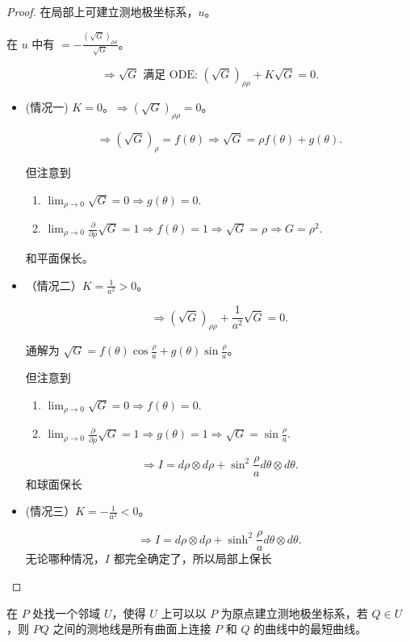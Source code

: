 \documentclass[lang=cn,10pt,thmcnt=section]{elegantbook}
\begin{document}
\begin{proof}
    在局部上可建立测地极坐标系，\( u \)。

在 \( u \) 中有 \(  = -\frac{(\sqrt{G})_{\rho\rho}}{\sqrt{G}} \)。

\[
\Rightarrow \sqrt{G} \text{ 满足 ODE: } (\sqrt{G})_{\rho\rho} + K \sqrt{G} = 0.
\]
\begin{itemize}
    \item (情况一) \( K = 0 \)。\(\Rightarrow (\sqrt{G})_{\rho\rho} = 0\)。

\[
\Rightarrow (\sqrt{G})_{\rho} = f(\theta) \Rightarrow \sqrt{G} = \rho f(\theta) + g(\theta).
\]

但注意到
\begin{enumerate}
    \item \(\lim_{\rho \to 0} \sqrt{G} = 0 \Rightarrow g(\theta) = 0\).
    \item \(\lim_{\rho \to 0} \frac{\partial}{\partial \rho} \sqrt{G} = 1 \Rightarrow f(\theta) = 1 \Rightarrow \sqrt{G} = \rho \Rightarrow G = \rho^2\).
\end{enumerate}

和平面保长。
    \item （情况二）\( K = \frac{1}{a^2} > 0 \)。

    \[
    \Rightarrow (\sqrt{G})_{\rho\rho} + \frac{1}{a^2} \sqrt{G} = 0.
    \]
    
    通解为 \(\sqrt{G} = f(\theta) \cos \frac{\rho}{a} + g(\theta) \sin \frac{\rho}{a}\)。
    
    但注意到
    \begin{enumerate}
        \item \(\lim_{\rho \to 0} \sqrt{G} = 0 \Rightarrow f(\theta) = 0\).
        \item \(\lim_{\rho \to 0} \frac{\partial}{\partial \rho} \sqrt{G} = 1 \Rightarrow g(\theta) = 1 \Rightarrow \sqrt{G} = \sin \frac{\rho}{a}\).
    \end{enumerate}
    
    \[
    \Rightarrow I = d\rho \otimes d\rho + \sin^2 \frac{\rho}{a} d\theta \otimes d\theta.
    \]和球面保长
\item (情况三）\( K = -\frac{1}{a^2} < 0 \)。

\[
\Rightarrow I = d\rho \otimes d\rho + \sinh^2 \frac{\rho}{a} d\theta \otimes d\theta.
\]
无论哪种情况，\( I \) 都完全确定了，所以局部上保长    
\end{itemize}
\end{proof}
\begin{theorem}[测地线的局部最短性]
    在 \( P \) 处找一个邻域 \( U \)，使得 \( U \) 上可以以 \( P \) 为原点建立测地极坐标系，若 \( Q \in U \)，则 \( PQ \) 之间的测地线是所有曲面上连接 \( P \) 和 \( Q \) 的曲线中的最短曲线。
\end{theorem}
\end{document}
